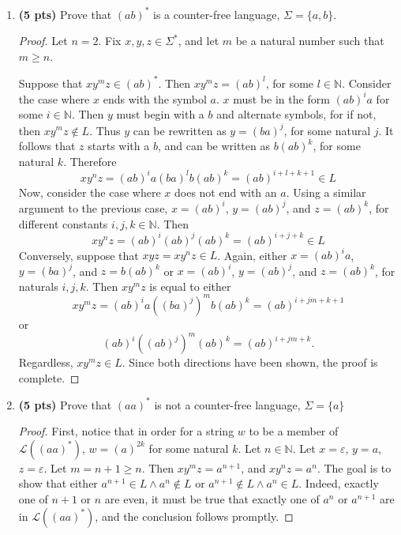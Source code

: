 \documentclass[11pt]{article}
\begin{document}
\begin{enumerate}[label=\textbf{Q\arabic*.}]
\begin{enumerate}[label=\textit{\alph*)}]
\begin{proof}
		Finally, \(w\) must end in a \(b\) because \(w \in \overline{\Sigma ^*\{a\}}\).

		This means that \(w = ab...ab\). It is obvious that \(w = (ab)^n\) for some \(n \in \mathbb{N}^+\). Thus \(w \in \mathcal{L}((ab)^*)\), proving that \((ab)^*\) can be matched by a star-free expression.
		\smallbreak
	\end{proof}

	\item \textbf{(5 pts)} Prove that $(ab)^*$ is a counter-free language,  $\Sigma = \{a,b\}$.
	
	\begin{proof}
		Let \(n = 2\). Fix \(x,y,z \in \Sigma ^*\), and let \(m\) be a natural number such that \(m \geq n\).

		Suppose that \(xy^m z \in (ab)^*\). Then \(xy^m z = (ab)^l\), for some \(l \in \mathbb{N}\). Consider the case where \(x\) ends with the symbol \(a\). \(x\) must be in the form \((ab)^i a\) for some \(i \in \mathbb{N}\). Then \(y\) must begin with a \(b\) and alternate symbols, for if not, then \(xy^m z \notin L\). Thus \(y\) can be rewritten as \(y = (ba)^j\), for some natural \(j\). It follows that \(z\) starts with a \(b\), and can be written as \(b(ab)^k\), for some natural \(k\). Therefore
		\[
			xy^n z = (ab)^i a (ba)^l b (ab)^k = (ab)^{i+l+k+1} \in L
		\]
		Now, consider the case where \(x\) does not end with an \(a\). Using a similar argument to the previous case, \(x = (ab)^i\), \(y = (ab)^j\), and \(z = (ab)^k\), for different constants \(i,j,k \in \mathbb{N}\). Then
		\[
			xy^n z = (ab)^i (ab)^j (ab)^k = (ab)^{i+j+k} \in L
		\]
		Conversely, suppose that \(xyz = xy^n z \in L\). Again, either \(x = (ab)^i a\), \(y = (ba)^j\), and \(z = b(ab)^k\) or \(x = (ab)^i\), \(y = (ab)^j\), and \(z = (ab)^k\), for naturals \(i,j,k\). Then \(xy^m z\) is equal to either
		\[
			xy^m z = (ab)^i a ((ba)^j)^m b(ab)^k = (ab)^{i+jm+k+1}
		\]
		or
		\[
			(ab)^i ((ab)^j)^m (ab)^k = (ab)^{i+jm+k} \text{.} 
		\]
		Regardless, \(xy^m z \in L\). Since both directions have been shown, the proof is complete.
		
	\end{proof}
	\item \textbf{(5 pts)} Prove that  $(aa)^*$ is not a counter-free language, $\Sigma = \{a\}$
	
	\begin{proof}
		First, notice that in order for a string \(w\) to be a member of \(\mathcal{L} ((aa)^*)\), \(w = (a)^{2k}\) for some natural \(k\). Let \(n \in \mathbb{N}\). Let \(x = \varepsilon\), \(y = a\), \(z = \varepsilon\). Let \(m = n + 1 \geq n\). Then \(xy^m z = a^{n+1} \), and \(xy^n z = a^n\). The goal is to show that either \(a^{n+1} \in L \land a^n \notin L\) or \(a^{n+1} \notin L \land a^n \in L\). Indeed, exactly one of \(n+1\) or \(n\) are even, it must be true that exactly one of \(a^n\) or \(a^{n+1}\) are in \(\mathcal{L} ((aa)^*)\), and the conclusion follows promptly.


\end{proof}
\end{enumerate}
\end{enumerate}
\end{document}
